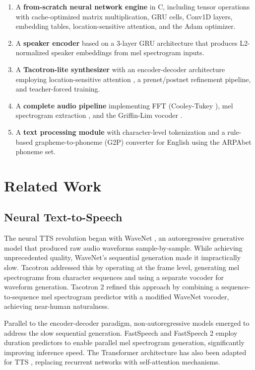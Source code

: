 \documentclass[conference]{IEEEtran}
\begin{document}
\begin{enumerate}
\item A \textbf{from-scratch neural network engine} in C, including tensor operations with cache-optimized matrix multiplication, GRU cells, Conv1D layers, embedding tables, location-sensitive attention, and the Adam optimizer.
\item A \textbf{speaker encoder} based on a 3-layer GRU architecture that produces L2-normalized speaker embeddings from mel spectrogram inputs.
\item A \textbf{Tacotron-lite synthesizer} with an encoder-decoder architecture employing location-sensitive attention \cite{chorowski2015attention}, a prenet/postnet refinement pipeline, and teacher-forced training.
\item A \textbf{complete audio pipeline} implementing FFT (Cooley-Tukey \cite{cooley1965fft}), mel spectrogram extraction \cite{stevens1937mel}, and the Griffin-Lim vocoder \cite{griffin1984signal}.
\item A \textbf{text processing module} with character-level tokenization and a rule-based grapheme-to-phoneme (G2P) converter for English using the ARPAbet phoneme set.
\end{enumerate}

\section{Related Work}

\subsection{Neural Text-to-Speech}

The neural TTS revolution began with WaveNet \cite{oord2016wavenet}, an autoregressive generative model that produced raw audio waveforms sample-by-sample. While achieving unprecedented quality, WaveNet's sequential generation made it impractically slow. Tacotron \cite{wang2017tacotron} addressed this by operating at the frame level, generating mel spectrograms from character sequences and using a separate vocoder for waveform generation. Tacotron 2 \cite{shen2018tacotron2} refined this approach by combining a sequence-to-sequence mel spectrogram predictor with a modified WaveNet vocoder, achieving near-human naturalness.

Parallel to the encoder-decoder paradigm, non-autoregressive models emerged to address the slow sequential generation. FastSpeech \cite{ren2019fastspeech} and FastSpeech 2 \cite{ren2021fastspeech2} employ duration predictors to enable parallel mel spectrogram generation, significantly improving inference speed. The Transformer architecture \cite{vaswani2017attention} has also been adapted for TTS \cite{li2019neural}, replacing recurrent networks with self-attention mechanisms.
\end{document}
